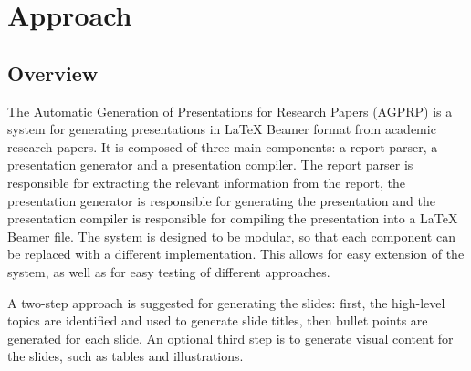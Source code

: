 \chapter{Approach}
\label{ch:approach}


\section{Overview}

The Automatic Generation of Presentations for Research Papers (AGPRP) is a system for generating presentations in \LaTeX{} Beamer format from academic research papers. It is composed of three main components: a report parser, a presentation generator and a presentation compiler. The report parser is responsible for extracting the relevant information from the report, the presentation generator is responsible for generating the presentation and the presentation compiler is responsible for compiling the presentation into a \LaTeX{} Beamer file. The system is designed to be modular, so that each component can be replaced with a different implementation. This allows for easy extension of the system, as well as for easy testing of different approaches.


A two-step approach is suggested for generating the slides: first, the high-level topics are identified and used to generate slide titles, then bullet points are generated for each slide. An optional third step is to generate visual content for the slides, such as tables and illustrations.

